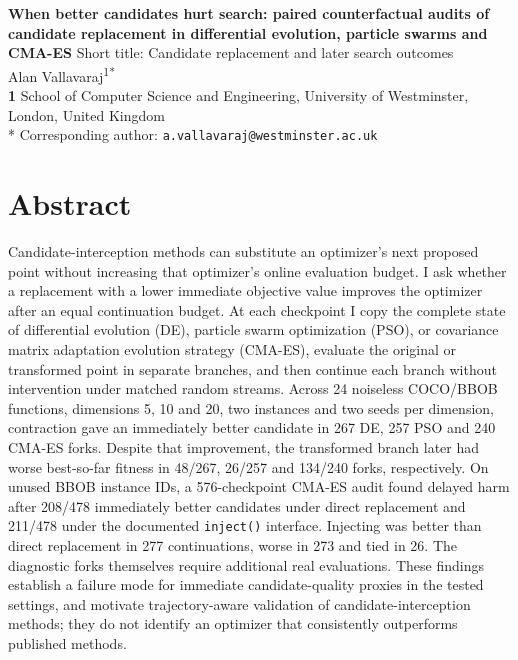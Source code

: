 \documentclass[10pt,letterpaper]{article}
\begin{document}
\vspace*{0.2in}
\begin{flushleft}
{\Large\textbf{When better candidates hurt search: paired counterfactual audits of candidate replacement in differential evolution, particle swarms and CMA-ES}}
\newline
Short title: Candidate replacement and later search outcomes
\newline
\\
Alan Vallavaraj\textsuperscript{1*}
\\
\bigskip
\textbf{1} School of Computer Science and Engineering, University of Westminster, London, United Kingdom
\\
\bigskip
* Corresponding author: \texttt{a.vallavaraj@westminster.ac.uk}
\end{flushleft}
\section*{Abstract}

Candidate-interception methods can substitute an optimizer's next proposed point without increasing that optimizer's online evaluation budget. I ask whether a replacement with a lower immediate objective value improves the optimizer after an equal continuation budget. At each checkpoint I copy the complete state of differential evolution (DE), particle swarm optimization (PSO), or covariance matrix adaptation evolution strategy (CMA-ES), evaluate the original or transformed point in separate branches, and then continue each branch without intervention under matched random streams. Across 24 noiseless COCO/BBOB functions, dimensions 5, 10 and 20, two instances and two seeds per dimension, contraction gave an immediately better candidate in 267 DE, 257 PSO and 240 CMA-ES forks. Despite that improvement, the transformed branch later had worse best-so-far fitness in 48/267, 26/257 and 134/240 forks, respectively. On unused BBOB instance IDs, a 576-checkpoint CMA-ES audit found delayed harm after 208/478 immediately better candidates under direct replacement and 211/478 under the documented \texttt{inject()} interface. Injecting was better than direct replacement in 277 continuations, worse in 273 and tied in 26. The diagnostic forks themselves require additional real evaluations. These findings establish a failure mode for immediate candidate-quality proxies in the tested settings, and motivate trajectory-aware validation of candidate-interception methods; they do not identify an optimizer that consistently outperforms published methods.
\end{document}
